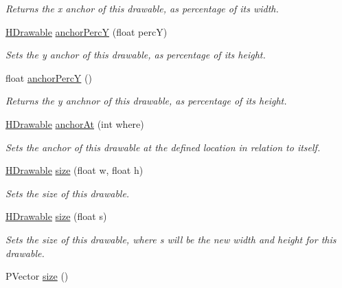 \begin{DoxyCompactItemize}
\begin{DoxyCompactList}\small\item\em Returns the x anchor of this drawable, as percentage of its width. \end{DoxyCompactList}\item 
\hyperlink{classhype_1_1drawable_1_1_h_drawable}{H\-Drawable} \hyperlink{classhype_1_1drawable_1_1_h_drawable_ae376527282453c44731ec7cd31de5f76}{anchor\-Perc\-Y} (float perc\-Y)
\begin{DoxyCompactList}\small\item\em Sets the y anchor of this drawable, as percentage of its height. \end{DoxyCompactList}\item 
float \hyperlink{classhype_1_1drawable_1_1_h_drawable_ac46830b7986dfc9ad6ddbf923e939bc1}{anchor\-Perc\-Y} ()
\begin{DoxyCompactList}\small\item\em Returns the y anchnor of this drawable, as percentage of its height. \end{DoxyCompactList}\item 
\hyperlink{classhype_1_1drawable_1_1_h_drawable}{H\-Drawable} \hyperlink{classhype_1_1drawable_1_1_h_drawable_a6d95df0dfd78df98ac6036a30d73f411}{anchor\-At} (int where)
\begin{DoxyCompactList}\small\item\em Sets the anchor of this drawable at the defined location in relation to itself. \end{DoxyCompactList}\item 
\hyperlink{classhype_1_1drawable_1_1_h_drawable}{H\-Drawable} \hyperlink{classhype_1_1drawable_1_1_h_drawable_a2d458cc012ce0421b443879baf054d0d}{size} (float w, float h)
\begin{DoxyCompactList}\small\item\em Sets the size of this drawable. \end{DoxyCompactList}\item 
\hyperlink{classhype_1_1drawable_1_1_h_drawable}{H\-Drawable} \hyperlink{classhype_1_1drawable_1_1_h_drawable_a249872347d0d2fca46d5cabee5d2c491}{size} (float s)
\begin{DoxyCompactList}\small\item\em Sets the size of this drawable, where {\ttfamily s} will be the new width and height for this drawable. \end{DoxyCompactList}\item 
P\-Vector \hyperlink{classhype_1_1drawable_1_1_h_drawable_a2336a63a4b1aabf58cbee348ecab5e9b}{size} ()

\end{DoxyCompactItemize}
